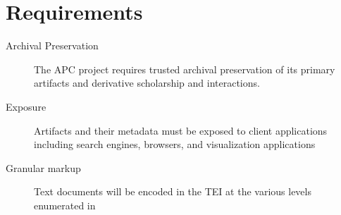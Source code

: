 \documentclass{article}
\begin{document}
\section{Requirements}

\begin{description}
  \item[Archival Preservation] The APC project requires trusted archival preservation of its primary artifacts and derivative scholarship and interactions.
  \item[Exposure] Artifacts and their metadata must be exposed to client applications including search engines, browsers, and visualization applications
  \item[Granular markup] Text documents will be encoded in the TEI at the various levels enumerated in \cite{bpgtei} 
\end{description}




\end{document}
